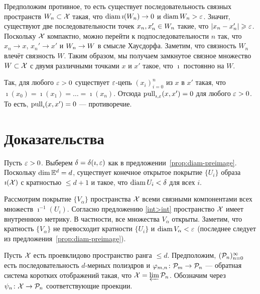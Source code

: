 \documentclass[oneside,a4paper]{article}
\begin{document}
Предположим противное, то есть существует последовательность связных пространств $W_n\subset \mathcal{X}$ такая, что $\mathop{\rm diam}\nolimits \imath(W_n)\to 0$ и $\mathop{\rm diam}\nolimits W_n>\varepsilon$.
Значит, существуют две последовательности точек $x_n,x_n'\z\in W_n$ такие, что $|x_n -x_n'|\geqslant\varepsilon$. 
Поскольку $\mathcal{X}$ компактно,
можно перейти к подпоследовательности $n$ так, что $x_n\to x$, $x_n'\to x'$ и $W_n\z\to W$ в смысле Хаусдорфа.
Заметим, что связность $W_n$ влечёт связность $W$.
Таким образом, мы получаем замкнутое связное множество $W\subset \mathcal{X}$ с двумя различными точками $x$ и $x'$ такое, что $\imath$ постоянно на $W$. 

Так, для любого $\varepsilon>0$ существует $\varepsilon$-цепь $(x_i)_{i=0}^n$ из $x$ в $x'$ такая, что $\imath(x_0)=\imath(x_1)=\dots=\imath(x_n)$.
Отсюда $\mathop{\rm pull}\nolimits_{\imath,\varepsilon}(x,x')=0$ для любого $\varepsilon>0$.
То есть, $\mathop{\rm pull}\nolimits_{\imath}(x,x')=0$ --- противоречие.
\qeds










\section{Доказательства}
\label{proofs}

Пусть $\varepsilon>0$.
Выберем $\delta\z=\delta(\imath,\eps)$ как в предложении~\ref{prop:diam-preimage}. 
Поскольку $\mathop{\rm dim}\nolimits \mathbb{E}^d=d$, существует конечное открытое покрытие $\{U_i\}$ образа $\imath(\mathcal{X})$ с кратностью $\le d+1$ и
такое, что $\mathop{\rm diam}\nolimits U_i<\delta$ для всех $i$.

Рассмотрим покрытие $\{V_\alpha\}$ пространства $\mathcal{X}$ всеми связными компонентами всех множеств $\imath^{-1}(U_i)$.
Согласно предложению \ref{int>int} пространство $\mathcal{X}$ имеет внутреннюю метрику.
В частности,
все множества $V_\alpha$ открыты.
Заметим, что кратность $\{V_\alpha\}$ не превосходит кратности $\{U_i\}$ 
и $\mathop{\rm diam}\nolimits V_\alpha<\varepsilon$ (последнее следует из предложения~\ref{prop:diam-preimage}).
\qeds

Пусть $\mathcal{X}$ есть проевклидово пространство ранга $\le d$.
Предположим, $(\mathcal{P}_n)_{n=0}^\infty$ есть последовательность $d$-мерных полиэдров и  
$\varphi_{m,n}\colon \mathcal{P}_m\to \mathcal{P}_n$
--- обратная система коротких отображений такая, что $\mathcal{X}=\varprojlim \mathcal{P}_n$.
Обозначим через $\psi_n\colon\mathcal{X}\to \mathcal{P}_n$ соответствующие проекции.
\end{document}
